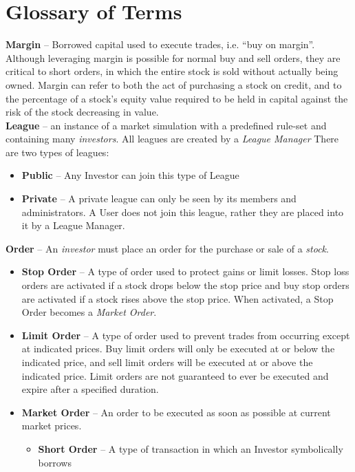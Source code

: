 \section{Glossary of Terms}

{
\raggedright
\textbf{Margin} -- Borrowed capital used to execute trades, i.e. ``buy on margin''. Although leveraging margin is possible for normal
	buy and sell orders, they are critical to short orders, in which the entire stock is sold without actually being owned. \cite{inv:marginreq} Margin
	can refer to both the act of purchasing a stock on credit, and to the percentage of a stock's equity value required to be held
	in capital against the risk of the stock decreasing in value. \cite{inv:margin}\\
\textbf{League} -- an instance of a market simulation with a predefined rule-set and containing many \emph{investors}. All leagues are created by a \emph{League Manager} There are two types of leagues:
\begin{itemize}
\item \textbf{Public} -- Any Investor can join this type of League
\item \textbf{Private} -- A private league can only be seen by its members and administrators. A User does not join this league, rather they are placed into it by a League Manager.
\end{itemize}
\textbf{Order} -- An \emph{investor} must place an order for the purchase or sale of a \emph{stock}.
\begin{itemize}
\item \textbf{Stop Order} -- A type of order used to protect gains or limit losses. Stop loss
orders are activated if a stock drops below the stop price and buy stop orders
are activated if a stock rises above the stop price. \cite{inv:stop} When activated, a Stop Order becomes a
\emph{Market Order}. 
\item \textbf{Limit Order} -- A type of order used to prevent trades from occurring except at indicated
prices. Buy limit orders will only be executed at or below the indicated price, and sell limit
orders will be executed at or above the indicated price. Limit orders are not guaranteed to ever
be executed and expire after a specified duration. \cite{inv:limit}
\item \textbf{Market Order} -- An order to be executed as soon as possible at current market prices.\cite{inv:market}
	\begin{itemize}
	\item \textbf{Short Order} -- A type of transaction in which an Investor symbolically borrows

\end{itemize}
\end{itemize}}
